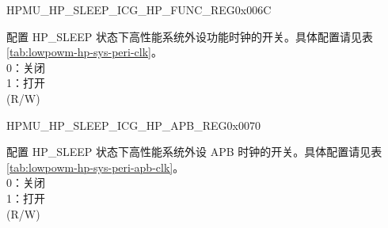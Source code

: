 \begin{register}{H}{PMU\_HP\_SLEEP\_ICG\_HP\_FUNC\_REG}{0x006C}\label{regdesc:PMUHPSLEEPICGHPFUNCREG}
%
\regnewline%
\begin{regdesc}\begin{reglist}
\label{fielddesc:PMUHPSLEEPDIGICGFUNCEN}\item [PMU\_HP\_SLEEP\_DIG\_ICG\_FUNC\_EN] 配置 HP\_SLEEP 状态下高性能系统外设功能时钟的开关。具体配置请见表 \ref{tab:lowpowm-hp-sys-peri-clk}。 \\ 
0：关闭\\ 
1：打开\\
(R/W)
\end{reglist}\end{regdesc}
\end{register}


\begin{register}{H}{PMU\_HP\_SLEEP\_ICG\_HP\_APB\_REG}{0x0070}\label{regdesc:PMUHPSLEEPICGHPAPBREG}
%
\regnewline%
\begin{regdesc}\begin{reglist}
\label{fielddesc:PMUHPSLEEPDIGICGAPBEN}\item [PMU\_HP\_SLEEP\_DIG\_ICG\_APB\_EN] 配置 HP\_SLEEP 状态下高性能系统外设 APB 时钟的开关。具体配置请见表 \ref{tab:lowpowm-hp-sys-peri-apb-clk}。 \\
0：关闭\\
1：打开\\
(R/W)
\end{reglist}\end{regdesc}
\end{register}



